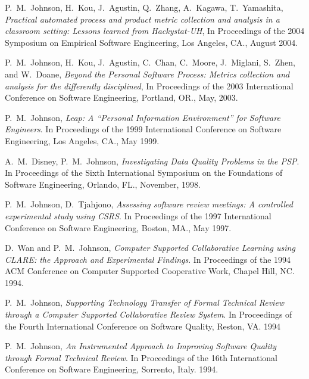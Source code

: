 \begin{Conference Publications}
\item P.~M.~Johnson, H.~Kou, J.~Agustin, Q.~Zhang, A.~Kagawa, T.~Yamashita,
{\em Practical automated process and product metric collection and analysis
in a classroom setting: {L}essons learned from {Hackystat-UH}}, In
Proceedings of the 2004 Symposium on Empirical Software Engineering, Los
Angeles, CA., August 2004.

\item P.~M.~Johnson, H.~Kou, J.~Agustin, C.~Chan, C.~Moore, 
J.~Miglani, S.~Zhen, and W.~Doane, {\em Beyond
the Personal Software Process: Metrics collection and analysis for the
differently disciplined}, In Proceedings of the 2003 International
Conference on Software Engineering, Portland, OR., May, 2003.

\item P.~M.~Johnson, {\em Leap: A ``Personal Information Environment'' for
Software Engineers}. In
  Proceedings of the 1999 International Conference on Software Engineering,
  Los Angeles, CA., May 1999.


\item A.~M.~Disney, P.~M.~Johnson, {\em Investigating Data Quality Problems in the PSP}.
In Proceedings of the Sixth International Symposium on the 
Foundations of Software Engineering, Orlando, FL., November, 1998.

  
\item P.~M.~Johnson, D.~Tjahjono, {\em Assessing software review
    meetings: A controlled experimental study using CSRS}. In
  Proceedings of the 1997 International Conference on Software Engineering,
  Boston, MA., May 1997.

\item D.~Wan and P.~M.~Johnson, {\em Computer Supported Collaborative
  Learning using CLARE: the Approach and Experimental Findings}.  
  In Proceedings of the 1994 ACM Conference on Computer Supported
  Cooperative Work, Chapel Hill, NC.  1994.
  
\item P.~M.~Johnson, {\em Supporting Technology Transfer of Formal
  Technical Review through a Computer Supported Collaborative Review
  System}.  In Proceedings of the Fourth International
  Conference on Software Quality, Reston, VA. 1994
  
\item P.~M.~Johnson, {\em An Instrumented Approach to Improving Software
  Quality through Formal Technical Review}. In Proceedings of
  the 16th International Conference on Software Engineering, Sorrento,
  Italy. 1994.
  

\end{Conference Publications}

